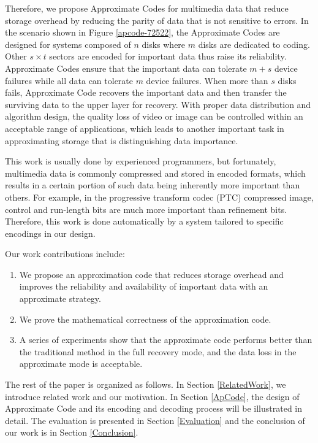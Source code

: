 \documentclass[sigconf]{acmart}
\begin{document}
Therefore, we propose Approximate Codes for multimedia data that reduce storage overhead by reducing the parity of data that is not sensitive to errors. In the scenario shown in Figure \ref{apcode-72522}, the Approximate Codes are designed for systems composed of $n$ disks where $m$ disks are dedicated to coding.
Other $s \times t$ sectors are encoded for important data thus raise its reliability. Approximate Codes ensure that the important data can tolerate $m+s$ device failures while all data can tolerate $m$ device failures.
When more than $s$ disks fails, Approximate Code recovers the important data and then transfer the surviving data to the upper layer for recovery. With proper data distribution and algorithm design, the quality loss of video or image can be controlled within an acceptable range of applications, which leads to another important task in approximating storage that is distinguishing data importance.

This work is usually done by experienced programmers, but fortunately, multimedia data is commonly compressed and stored in encoded formats, which results in a certain portion of such data being inherently more important than others. For example, in the progressive transform codec (PTC) compressed image, control and run-length bits are much more important than refinement bits. Therefore, this work is done automatically by a system tailored to specific encodings in our design.

Our work contributions include:
\begin{enumerate}
\item We propose an approximation code that reduces storage overhead and improves the reliability and availability of important data with an approximate strategy.
\item We prove the mathematical correctness of the approximation code.
\item A series of experiments show that the approximate code performs better than the traditional method in the full recovery mode, and the data loss in the approximate mode is acceptable.
\end{enumerate}

The rest of the paper is organized as follows. In Section \ref{RelatedWork}, we introduce related work and our motivation. In Section \ref{ApCode}, the design of Approximate Code and its encoding and decoding process will be illustrated in detail. The evaluation is presented in Section \ref{Evaluation} and the conclusion of our work is in Section \ref{Conclusion}. 
\end{document}
